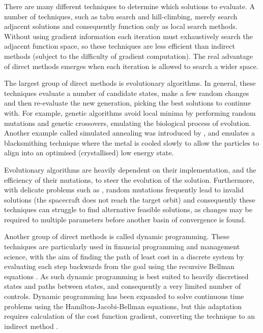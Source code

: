 There are many different techniques to determine which solutions to evaluate. A number of techniques, such as tabu search and hill-climbing, merely search adjacent solutions and consequently function only as local search methods. Without using gradient information each iteration must exhaustively search the adjacent function space, so these techniques are less efficient than indirect methods (subject to the difficulty of gradient computation). The real advantage of direct methods emerges when each iteration is allowed to search a wider space.

The largest group of direct methods is evolutionary algorithms. In general, these techniques evaluate a number of candidate states, make a few random changes and then re-evaluate the new generation, picking the best solutions to continue with. For example, genetic algorithms avoid local minima by performing random mutations and genetic crossovers, emulating the biological process of evolution. Another example called simulated annealing was introduced by \textcite{Kirkpatrick1983}, and emulates a blacksmithing technique where the metal is cooled slowly to allow the particles to align into an optimised (crystallised) low energy state. 

Evolutionary algorithms are heavily dependent on their implementation, and the efficiency of their mutations, to steer the evolution of the solution. Furthermore, with delicate problems such as \BW, random mutations frequently lead to invalid solutions (the spacecraft does not reach the target orbit) and consequently these techniques can struggle to find alternative feasible solutions, as changes may be required to multiple parameters before another basin of convergence is found.

Another group of direct methods is called dynamic programming. These techniques are particularly used in financial programming and management science, with the aim of finding the path of least cost in a discrete system by evaluating each step backwards from the goal using the recursive Bellman equations \parencite{Bellman1957}. As such dynamic programming is best suited to heavily discretised states and paths between states, and consequently a very limited number of controls. Dynamic programming has been expanded to solve continuous time problems using the Hamilton-Jacobi-Bellman equations, but this adaptation requires calculation of the cost function gradient, converting the technique to an indirect method \parencite{Bellman1957}.


